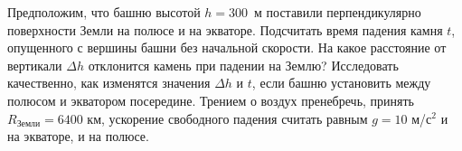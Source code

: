 
Предположим, что башню высотой $h=300$~м поставили перпендикулярно поверхности Земли на полюсе и на экваторе. 
Подсчитать время падения камня $t$, опущенного с вершины башни без начальной скорости. На какое расстояние от 
вертикали $\Delta h$ отклонится камень при падении на Землю? Исследовать качественно, как изменятся значения  $\Delta h$ и  
$t$, если башню установить между полюсом и экватором посередине. Трением о воздух пренебречь, принять $R_\text{Земли} = 6400$ км, 
ускорение свободного падения считать равным $g=10$ м/с$^2$ и на экваторе, и на полюсе.